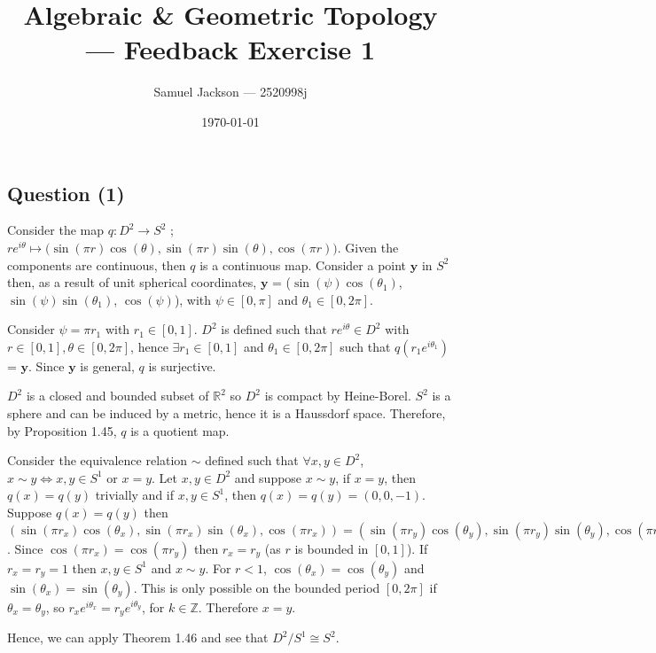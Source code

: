 \documentclass{article}
\title{Algebraic \& Geometric Topology --- Feedback Exercise 1}
\author{Samuel Jackson --- 2520998j}
\date{\today}
\begin{document}
\maketitle

\begin{center}
\section*{Question (1)}
\end{center}

\begin{flushleft}
Consider the map $q: D^2 \rightarrow S^2$ ; $re^{i\theta} \mapsto \big(\sin(\pi r)\cos(\theta), \sin(\pi r)\sin(\theta), \cos(\pi r)\big)$. Given the components are continuous, then $q$ is a continuous map. Consider a point $\textbf{y}$ in $S^2$ then, as a result of unit spherical coordinates, $\textbf{y}$ = ($\sin(\psi)\cos(\theta_1)$, $\sin(\psi)\sin(\theta_1)$, $\cos(\psi)$), with $\psi \in [0, \pi]$ and $\theta_1 \in [0, 2\pi]$. \newline

Consider $\psi = \pi r_1$ with $r_1 \in [0,1]$. $D^2$ is defined such that $re^{i\theta} \in D^2$ with $r \in [0,1], \theta \in [0, 2\pi]$, hence $\exists r_1 \in [0, 1]$ and $\theta_1 \in [0, 2\pi]$ such that $q(r_1e^{i\theta_1})$ = $\textbf{y}$. Since $\textbf{y}$ is general, $q$ is surjective. \newline

$D^2$ is a closed and bounded subset of $\mathbb{R}^2$ so $D^2$ is compact by Heine-Borel. $S^2$ is a sphere and can be induced by a metric, hence it is a Haussdorf space. Therefore, by Proposition 1.45, $q$ is a quotient map. \newline

Consider the equivalence relation $\sim$ defined such that $\forall x,y \in D^2$, $x \sim y \iff x, y \in S^1$ or $x = y$. Let $x, y \in D^2$ and suppose $x \sim y$, if $x = y$, then $q(x) = q(y)$ trivially and if $x,y \in S^1$, then $q(x) = q(y) = (0, 0, -1)$. Suppose $q(x) = q(y)$ then $(\sin(\pi r_x)\cos(\theta_x), \sin(\pi r_x)\sin(\theta_x), \cos(\pi r_x)) = (\sin(\pi r_y)\cos(\theta_y), \sin(\pi r_y)\sin(\theta_y), \cos(\pi r_y))$. Since $\cos(\pi r_x) = \cos(\pi r_y)$ then $r_x = r_y$ (as $r$ is bounded in $[0,1]$). If $r_x = r_y = 1$ then $x, y \in S^1$ and $x \sim y$.
For $r < 1$, $\cos(\theta_x) = \cos(\theta_y)$ and $\sin(\theta_x) = \sin(\theta_y)$. This is only possible on the bounded period $[0, 2\pi]$ if $\theta_x = \theta_y$, so $r_xe^{i\theta_x} = r_ye^{i\theta_y}$, for $k \in \mathbb{Z}$. Therefore $x = y$.

Hence, we can apply Theorem 1.46 and see that $D^2 / S^1 \cong S^2$.
\end{flushleft}
\end{document}
